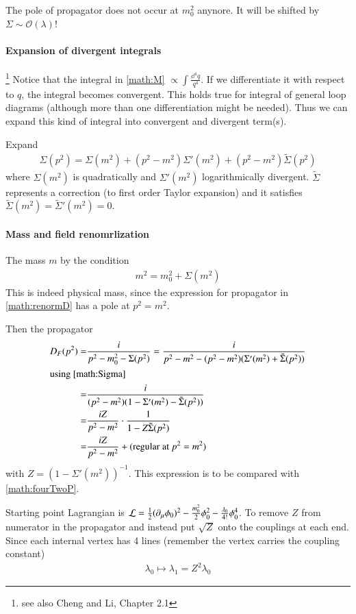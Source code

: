 The pole of propagator does not occur at $m_0^2$ anynore. It will be shifted by $\Sigma \sim \mathcal{O}(\lambda)$!

\paragraph{Expansion of divergent integrals}\footnote{see also Cheng and Li, Chapter 2.1}
Notice that the integral in \ref{math:M} $\propto \int \frac{\dd^4 q}{q^4}$. If we differentiate it with respect to $q$, the integral becomes convergent. This holds true for integral of general loop diagrams (although more than one differentiation might be needed). Thus we can expand this kind of integral into convergent and divergent term(s).

Expand
\begin{align}\label{math:Sigma}
	\Sigma(p^2) = \Sigma(m^2) + (p^2 - m^2) \Sigma'(m^2) + (p^2 - m^2)\tilde{\Sigma}(p^2)
\end{align}
where $\Sigma(m^2)$ is quadratically and $\Sigma'(m^2)$ logarithmically divergent.
$\tilde{\Sigma}$ represents a correction (to first order Taylor expansion) and it satisfies $\tilde{\Sigma}(m^2) = \tilde{\Sigma}'(m^2) = 0$.

\paragraph{Mass and field renomrlization}
The mass $m$ by the condition 
\begin{align}
	m^2	= m_0^2 + \Sigma(m^2)
\end{align}
This is indeed physical mass, since the expression for propagator in \ref{math:renormD} has a pole at $p^2 = m^2$.

Then the propagator
\begin{align}
	D_F(p^2) =& \frac{i}{p^2 - m^2_0 - \Sigma(p^2)} = \frac{i}{p^2 - m^2 - (p^2 - m^2)(\Sigma '(m^2) + \tilde{\Sigma}(p^2))} \notag \\
	\shortintertext{using \ref{math:Sigma}}
	=& \frac{i}{(p^2 - m^2)(1-\Sigma'(m^2)-\tilde{\Sigma}(p^2))} \notag\\
	=& \frac{iZ}{p^2 - m^2} \cdot \frac{1}{1-Z\tilde{\Sigma}(p^2)} \notag \\
	=& \frac{iZ}{p^2 - m^2} + \text{(regular at $p^2 = m^2$)}
\end{align}
with $Z = \left( 1 - \Sigma '(m^2) \right)^{-1}$. This expression is to be compared with \ref{math:fourTwoP}.

Starting point Lagrangian is $\mathcal{L} = \frac{1}{2}(\partial_\mu \phi_0)^2 - \frac{m^2_0}{2}\phi_0^2 - \frac{\lambda_0}{4!}\phi_0^4$. To remove $Z$ from numerator in the propagator and instead put $\sqrt{Z}$ onto the couplings at each end. Since each internal vertex has 4 lines (remember the vertex carries the coupling constant)
\begin{align}
	\lambda_0 \longmapsto \lambda_1 = Z^2 \lambda_0
\end{align}

